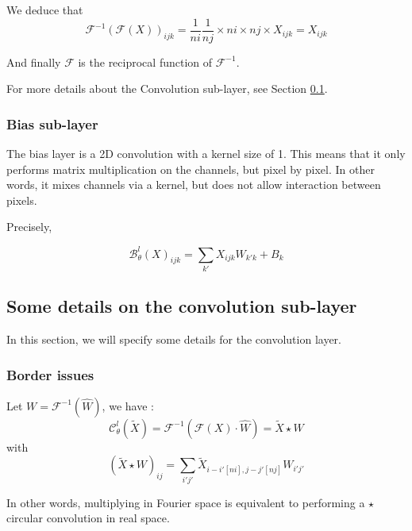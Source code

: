 We deduce that
\begin{equation*}
	\mathcal{F}^{-1}(\mathcal{F}(X))_{ijk} = \frac{1}{ni}\frac{1}{nj} \times ni\times nj\times X_{ijk} = X_{ijk}
\end{equation*}

And finally $\mathcal{F}$ is the reciprocal function of $\mathcal{F}^{-1}$.

For more details about the Convolution sub-layer, see Section \ref{FNO.details_conv}.

\subsubsection{Bias sub-layer} \label{FNO.bias_sublayer}

The bias layer is a 2D convolution with a kernel size of 1. This means that it only performs matrix multiplication on the channels, but pixel by pixel. In other words, it mixes channels via a kernel, but does not allow interaction between pixels.

Precisely,

\begin{equation*}
	\mathcal{B}_\theta^l(X)_{ijk}=\sum_{k'}X_{ijk}W_{k'k}+B_k
\end{equation*}

\newpage

\subsection{Some details on the convolution sub-layer} \label{FNO.details_conv}

In this section, we will specify some details for the convolution layer.

\subsubsection{Border issues}

Let $W=\mathcal{F}^{-1}(\hat{W})$, we have :
\begin{equation*}
	\mathcal{C}_\theta^l(\tilde{X})=\mathcal{F}^{-1}\left(\mathcal{F}(X)\cdot\hat{W}\right)=\tilde{X}\star W
\end{equation*}
with
\begin{equation*}
	(\tilde{X}\star W)_{ij}=\sum_{i'j'}\tilde{X}_{i-i'[ni],j-j'[nj]}W_{i'j'}
\end{equation*}

In other words, multiplying in Fourier space is equivalent to performing a $\star$ circular convolution in real space. 


